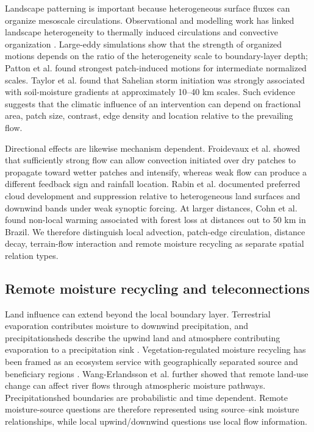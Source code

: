 \documentclass[10pt,twocolumn]{article}
\begin{document}
Landscape patterning is important because heterogeneous surface fluxes can organize mesoscale circulations. Observational and modelling work has linked landscape heterogeneity to thermally induced circulations and convective organization \cite{weaver2001}. Large-eddy simulations show that the strength of organized motions depends on the ratio of the heterogeneity scale to boundary-layer depth; Patton et al. \cite{patton2005} found strongest patch-induced motions for intermediate normalized scales. Taylor et al. \cite{taylor2011} found that Sahelian storm initiation was strongly associated with soil-moisture gradients at approximately 10--40 km scales. Such evidence suggests that the climatic influence of an intervention can depend on fractional area, patch size, contrast, edge density and location relative to the prevailing flow.

Directional effects are likewise mechanism dependent. Froidevaux et al. \cite{froidevaux2014} showed that sufficiently strong flow can allow convection initiated over dry patches to propagate toward wetter patches and intensify, whereas weak flow can produce a different feedback sign and rainfall location. Rabin et al. \cite{rabin1990} documented preferred cloud development and suppression relative to heterogeneous land surfaces and downwind bands under weak synoptic forcing. At larger distances, Cohn et al. \cite{cohn2019} found non-local warming associated with forest loss at distances out to 50 km in Brazil. We therefore distinguish local advection, patch-edge circulation, distance decay, terrain-flow interaction and remote moisture recycling as separate spatial relation types.

\subsection{Remote moisture recycling and teleconnections}

Land influence can extend beyond the local boundary layer. Terrestrial evaporation contributes moisture to downwind precipitation, and precipitationsheds describe the upwind land and atmosphere contributing evaporation to a precipitation sink \cite{keys2012}. Vegetation-regulated moisture recycling has been framed as an ecosystem service with geographically separated source and beneficiary regions \cite{keys2016}. Wang-Erlandsson et al. \cite{wangerlandsson2018} further showed that remote land-use change can affect river flows through atmospheric moisture pathways. Precipitationshed boundaries are probabilistic and time dependent. Remote moisture-source questions are therefore represented using source--sink moisture relationships, while local upwind/downwind questions use local flow information.
\end{document}
